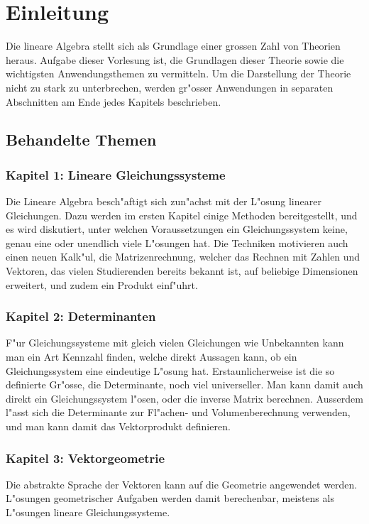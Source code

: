 %
%
%
\chapter*{Einleitung}

Die lineare Algebra stellt sich als Grundlage einer grossen
Zahl von Theorien heraus.
Aufgabe dieser Vorlesung ist, die
Grundlagen dieser Theorie sowie die wichtigsten Anwendungsthemen
zu vermitteln.
Um die Darstellung der Theorie nicht zu stark zu unterbrechen,
werden gr"osser Anwendungen in separaten Abschnitten am Ende
jedes Kapitels beschrieben.

\section*{Behandelte Themen}
\subsection*{Kapitel 1: Lineare Gleichungssysteme}
Die Lineare Algebra besch"aftigt sich zun"achst mit der L"osung linearer
Gleichungen.
Dazu werden im ersten Kapitel einige Methoden bereitgestellt,
und es wird diskutiert, unter welchen Voraussetzungen ein
Gleichungssystem keine, genau eine oder unendlich viele
L"osungen hat.
Die Techniken motivieren auch einen neuen Kalk"ul, die Matrizenrechnung,
welcher das Rechnen mit Zahlen und Vektoren, das vielen
Studierenden bereits bekannt ist, auf beliebige Dimensionen erweitert,
und zudem ein Produkt einf"uhrt.

\subsection*{Kapitel 2: Determinanten}
F"ur Gleichungssysteme mit gleich vielen Gleichungen wie Unbekannten
kann man ein Art Kennzahl finden, welche direkt Aussagen kann,
ob ein Gleichungssystem eine eindeutige L"osung hat.
Erstaunlicherweise ist die so definierte Gr"osse, die Determinante,
noch viel universeller.
Man kann damit auch direkt ein Gleichungssystem l"osen, oder
die inverse Matrix berechnen.
Ausserdem l"asst sich die Determinante zur Fl"achen- und Volumenberechnung
verwenden, und man kann damit das Vektorprodukt definieren.

\subsection*{Kapitel 3: Vektorgeometrie}
Die abstrakte Sprache der Vektoren kann auf die Geometrie angewendet
werden.
L"osungen geometrischer Aufgaben werden damit berechenbar,
meistens als L"osungen lineare Gleichungssysteme.

